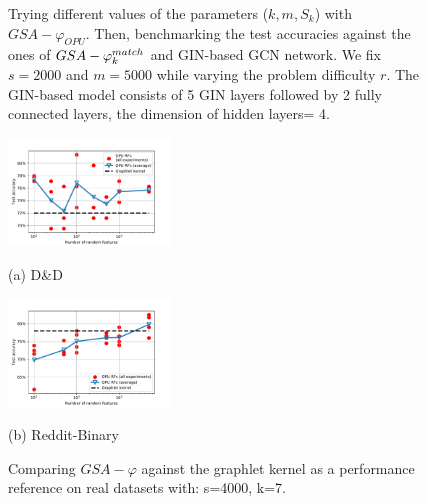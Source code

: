 \documentclass{article}
\begin{document}
\begin{figure}
	\captionsetup[subfigure]{justification=centering}
	\centering
	\caption{ Trying different values of the parameters ($k,m,S_k$) with $GSA-\varphi_{OPU}$. Then, benchmarking the test accuracies against the ones of $GSA-\varphi^{match}_k$ and GIN-based GCN network. We fix  $s=2000$ and $m=5000$ while varying  the problem difficulty $r$. The GIN-based model consists of 5 GIN layers followed by 2 fully connected layers, the dimension of hidden layers= 4.}
	\label{fig:GCN}
\end{figure}



\begin{figure}[h]
%
\begin{minipage}[b]{.48\linewidth}
  \centering
  \centerline{\includegraphics[width=4.3cm]{figs/DD.pdf}}
  \centerline{(a) D\&D }\medskip
  \label{subfig:RF_maps}
\end{minipage}
\hfill
\begin{minipage}[b]{0.48\linewidth}
  \centering
  \centerline{\includegraphics[width=4.3cm]{figs/Reddit.pdf}}
  \centerline{(b) Reddit-Binary}\medskip
\end{minipage}
%
\caption{Comparing $GSA-\varphi$ against the graphlet kernel as a performance reference on real datasets with: s=4000, k=7.}
\label{fig:DD}
%
\end{figure}
\end{document}
